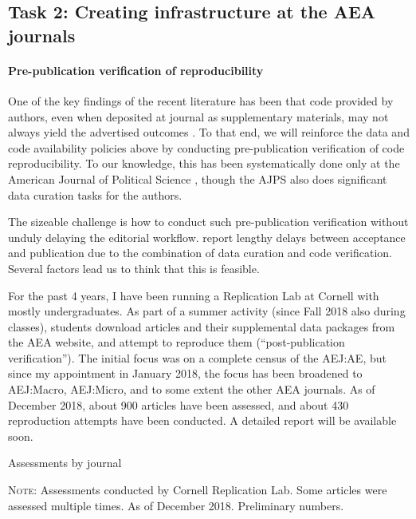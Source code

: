 \documentclass[PP]{AEA}
\begin{document}
\FloatBarrier
\subsection{Task 2: Creating infrastructure at the AEA journals}

\paragraph{Pre-publication verification of reproducibility} One of the key findings of the recent literature has been that code provided by authors, even when deposited at journal as supplementary materials, may not always yield the advertised outcomes \citep{Chang2015-dl,ChangAm.Econ.Rev.2017,Hoffler-LibMag.2017}. To that end, we will reinforce the data and code availability policies above by conducting pre-publication verification of code reproducibility. To our knowledge, this has been systematically done only at the American Journal of Political Science \citep{ChristianInt.J.Digit.Curation2018}, though the AJPS also does significant data curation tasks for the authors.

The sizeable challenge is how to conduct such pre-publication verification without unduly delaying the editorial workflow. \cite{ChristianInt.J.Digit.Curation2018} report lengthy delays between acceptance and publication due to the combination of data curation and code verification. Several factors lead us to think that this is feasible.

For the past 4 years, I have been running a Replication Lab at Cornell with mostly undergraduates. As part of a summer activity (since Fall 2018 also during classes), students download articles and their supplemental data packages from the AEA website, and attempt to reproduce them (``post-publication verification''). The initial focus was on a complete census of the AEJ:AE, but since my appointment in January 2018, the focus has been broadened to AEJ:Macro, AEJ:Micro, and to some extent the other AEA journals. As of December 2018, about 900 articles have been assessed, and about 430 reproduction attempts have been conducted. 
A detailed report will be available soon. 
\begin{table}
\caption{Assessments by journal\label{tab:assess_by_journal}} 
\tiny
{}

\begin{minipage}{\textwidth}
	\textsc{Note:} Assessments conducted by Cornell Replication Lab. Some articles were assessed multiple times. As of December 2018. Preliminary numbers. 
\end{minipage}
\end{table}
\end{document}
